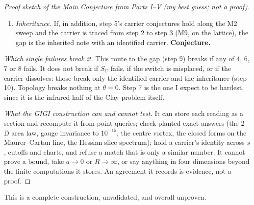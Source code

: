 \begin{proof}[Proof sketch of the Main Conjecture from Parts I--V \textmd{(my best guess; not a proof)}]
\begin{enumerate}[leftmargin=18pt,itemsep=2pt,topsep=2pt]
A bound $|\langle A\,B(\tau)\rangle_{\rm c}|\leq C_{A,B}\,e^{-\Delta_{\min}|\tau|}$ that is uniform in $R$ passes to
any limit $R\to\infty$, and reflection positivity passes with it (Proposition~\ref{prop:V-rp}). Osterwalder--Schrader reconstruction then gives a
Hilbert space and $H\geq0$ with no spectrum in $(0,\Delta_{\min})$ on the subspace generated by local observables:
the gap, $\Delta=c\Lambda$. \emph{Euclidean invariance, uniqueness of the infinite-volume limit and
non-triviality are further conditions, not supplied by any step above.}
\item \emph{Inheritance.} If, in addition, step 5's carrier conjectures hold along the M2 sweep and the carrier is traced from step 2 to step 3
(M9, on the lattice), the gap is the inherited note with an identified carrier. \textbf{Conjecture.}
\end{enumerate}
\emph{Which single failures break it.} This route to the gap (step 9) breaks if any of 4, 6, 7 or 8 fails. It does not break if
$S_C$ fails, if the switch is misplaced, or if the carrier dissolves: those break only the identified carrier and the
inheritance (step 10). Topology breaks nothing at $\theta=0$. Step 7 is the one I expect to be hardest, since it is the
infrared half of the Clay problem itself.

\emph{What the GIGI construction can and cannot test.} It can store each reading as a section and recompute it from
point queries; check planted exact answers (the 2-D area law, gauge invariance to $10^{-15}$, the centre vortex, the
closed forms on the Maurer--Cartan line, the Hessian slice spectrum); hold a carrier's identity across $s$, cutoffs
and charts, and refuse a match that is only a similar number. It cannot prove a bound, take $a\to0$ or $R\to\infty$,
or say anything in four dimensions beyond the finite computations it stores. An agreement it records is evidence, not
a proof.
\end{proof}

This is a complete construction, unvalidated, and overall unproven.
